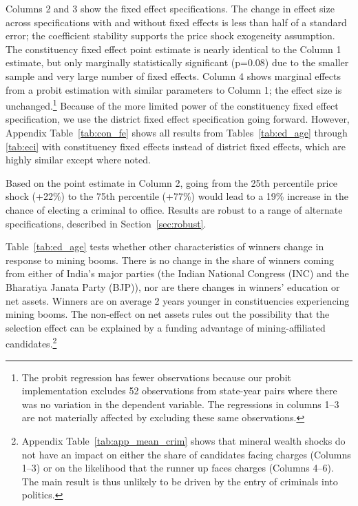 \documentclass[12pt,letterpaper]{article}
\begin{document}
Columns 2 and 3 show the fixed effect specifications. The change in
effect size across specifications with and without fixed effects is
less than half of a standard error; the coefficient stability supports
the price shock exogeneity assumption. The constituency fixed effect
point estimate is nearly identical to the Column 1 estimate, but only
marginally statistically significant (p=0.08) due to the smaller
sample and very large number of fixed effects. Column 4 shows
marginal effects from a probit estimation with similar parameters to
Column 1; the effect size is unchanged.\footnote{The probit regression
  has fewer observations because our probit implementation excludes 52
  observations from state-year pairs where there was no variation in
  the dependent variable. The regressions in columns 1--3 are not
  materially affected by excluding these same observations.} Because
of the more limited power of the constituency fixed effect
specification, we use the district fixed effect specification going
forward. However, Appendix Table~\ref{tab:con_fe} shows all results
from Tables~\ref{tab:ed_age} through \ref{tab:eci} with constituency
fixed effects instead of district fixed effects, which are highly
similar except where noted.

Based on the point estimate in Column 2, going from the 25th
percentile price shock (+22\%) to the 75th percentile (+77\%) would
lead to a 19\% increase in the chance of electing a criminal to
office. Results are robust to a range of alternate specifications,
described in Section~\ref{sec:robust}.

Table~\ref{tab:ed_age} tests whether other characteristics of winners
change in response to mining booms. There is no change in the share of
winners coming from either of India's major parties (the Indian
National Congress (INC) and the Bharatiya Janata Party (BJP)), nor are
there changes in winners' education or net assets. Winners are on
average 2 years younger in constituencies experiencing mining
booms. The non-effect on net assets rules out the possibility that the
selection effect can be explained by a funding advantage of
mining-affiliated candidates.\footnote{Appendix
  Table~\ref{tab:app_mean_crim} shows that mineral wealth shocks do
  not have an impact on either the share of candidates facing charges
  (Columns 1--3) or on the likelihood that the runner up faces charges
  (Columns 4--6). The main result is thus unlikely to be driven by the
  entry of criminals into politics.}
\end{document}
